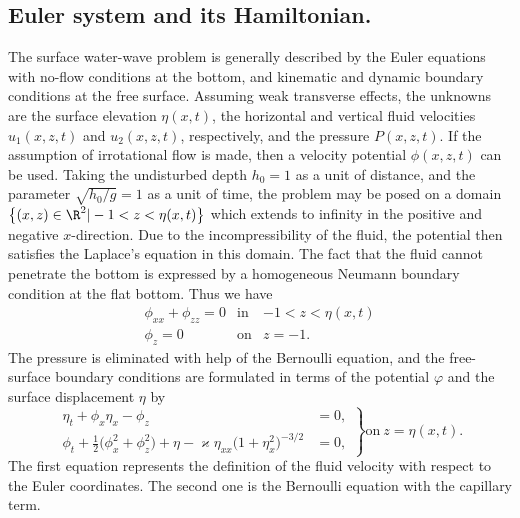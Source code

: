 \subsection{Euler system and its Hamiltonian.}

The surface water-wave problem 
is generally described by the Euler equations with no-flow conditions at
the bottom, and kinematic and dynamic boundary conditions at
the free surface. Assuming weak transverse effects, the unknowns
are the surface elevation $\eta(x,t)$, the horizontal and vertical 
fluid velocities $u_1(x,z,t)$ and $u_2(x,z,t)$, respectively,
and the pressure $P(x,z,t)$.
If the assumption of irrotational flow is made, then
a velocity potential $\phi(x,z,t)$ can be used.
Taking the undisturbed depth $h_0 = 1$ as a unit of distance, 
and the parameter $\sqrt{h_0/g} = 1$ as a unit of time, 
the problem may be posed on a domain
$\left\{(x,z) \in \R^2 | -1 < z < \eta(x,t) \right\}$
which extends to infinity in the positive and negative $x$-direction.
Due to the incompressibility of the fluid, the potential then satisfies
the Laplace's equation in this domain.
The fact that the fluid cannot penetrate the bottom is expressed by
a homogeneous Neumann boundary condition at the flat bottom.
Thus we have
%
\begin{eqnarray*}
	\phi_{xx} + \phi_{zz} = 0 & \mbox{in} &  -1 < z < \eta(x,t)
	\\
	\phi_z = 0              & \mbox{on} &  z=-1.
\end{eqnarray*}
%
The pressure is eliminated with help
of the Bernoulli equation, and the free-surface boundary conditions are formulated
in terms of the potential $\varphi$ and the surface displacement $\eta$ by
%
\[
	\left.
		\begin{array}{rc}
			\eta_t+\phi_x\eta_x-\phi_z
			& =0,
			\\
			\phi_t+\frac{1}{2} \big( \phi^2_x+\phi^2_z \big) + \eta
			- \varkappa \eta_{xx} \big( 1 + \eta_x^2 \big)^{- 3/2}
			& = 0, 
		\end{array}
	\right\}
	\mbox{on} \ z=\eta(x,t).
\]
%
The first equation represents the definition of the fluid velocity
with respect to the Euler coordinates.
The second one is the Bernoulli equation with the capillary term.


